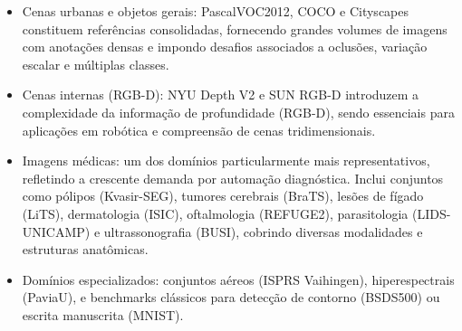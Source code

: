 \begin{itemize}

\item Cenas urbanas e objetos gerais: \ac{PascalVOC2012}, COCO e Cityscapes constituem referências consolidadas, fornecendo grandes volumes de imagens com anotações densas e impondo desafios associados a oclusões, variação escalar e múltiplas classes.


\item Cenas internas (RGB-D): NYU Depth V2 e SUN RGB-D introduzem a complexidade da informação de profundidade (RGB-D), sendo essenciais para aplicações em robótica e compreensão de cenas tridimensionais.


\item Imagens médicas: um dos domínios particularmente mais representativos, refletindo a crescente demanda por automação diagnóstica. Inclui conjuntos como pólipos (Kvasir-SEG), tumores cerebrais (BraTS), lesões de fígado (LiTS), dermatologia (ISIC), oftalmologia (REFUGE2), parasitologia (LIDS-UNICAMP) e ultrassonografia (BUSI), cobrindo diversas modalidades e estruturas anatômicas.


\item Domínios especializados: conjuntos aéreos (ISPRS Vaihingen), hiperespectrais (PaviaU), e benchmarks clássicos para detecção de contorno (BSDS500) ou escrita manuscrita (MNIST).


\end{itemize}

